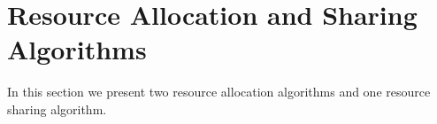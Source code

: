 \section{Resource Allocation and Sharing Algorithms}
\label{sc}
In this section we present two resource allocation algorithms and one resource sharing algorithm.





